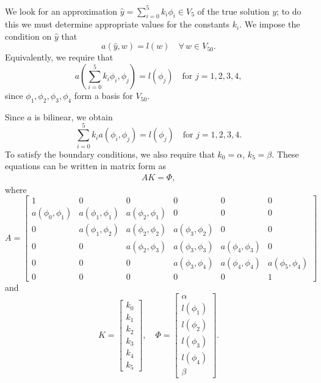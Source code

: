 We look for an approximation $\hat{y} = \sum_{i=0}^5 k_i \phi_i \in V_5$ of the true solution $y$; to do this we must determine appropriate values for the constants $k_i$. We impose the condition on $\hat{y}$ that 
\[a(\hat{y},w) = l(w) \quad \forall \, w \in V_{50}.\]
Equivalently, we require that 
\[a \left( \sum_{i=0}^5 k_i \phi_i,\phi_j \right) = l(\phi_j) \quad \text{for } j = 1,2,3,4,\]
since $\phi_1, \phi_2, \phi_3, \phi_4$ form a basis for $V_{50}$.


Since $a$ is bilinear, we obtain 
\[
\sum_{i=0}^5 k_i  a ( \phi_i,\phi_j ) = l(\phi_j) \quad \text{for } j = 1,2,3,4.
\]
To satisfy the boundary conditions, we also require that $k_0 = \alpha$, $k_5 = \beta$.
These equations can be written in matrix form as 
\begin{align} AK = \Phi,\label{FE:linear_system}\end{align}
where 
\[
A = \left[\begin{array}{cccccc}1 & 0 & 0 & 0 & 0 & 0 \\a(\phi_0,\phi_1) & a(\phi_1,\phi_1) & a(\phi_2,\phi_1) & 0 & 0 & 0 \\0 & a(\phi_1,\phi_2) & a(\phi_2,\phi_2) & a(\phi_3,\phi_2) & 0 & 0 \\0 & 0 & a(\phi_2,\phi_3) & a(\phi_3,\phi_3) & a(\phi_4,\phi_3) & 0 \\0 & 0 & 0 & a(\phi_3,\phi_4) & a(\phi_4,\phi_4) & a(\phi_5,\phi_4) \\0 & 0 & 0 & 0 & 0 &1\end{array}\right]
\]
and
\[
K = \left[\begin{array}{c}k_0 \\k_1 \\k_2 \\k_3 \\k_4 \\k_5\end{array}\right] , \quad\Phi =  \left[\begin{array}{c}\alpha \\l(\phi_1) \\l(\phi_2) \\l(\phi_3) \\l(\phi_4) \\\beta\end{array}\right] .
\]

